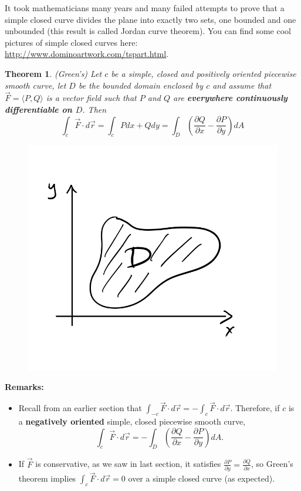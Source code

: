 \documentclass[12pt]{article}
\newcommand{\p}{\partial}
\newcommand{\vr}{\vec{r}{}}
\newcommand{\vF}{\vec{F}}
\renewcommand{\lg}{\langle}
\newcommand{\rg}{\rangle}
\newcommand{\Q}{\frac{\p Q}{\p x}}
\renewcommand{\P}{\frac{\p P}{\p y}}
\newtheorem{theorem}{Theorem}
\begin{document}
It took mathematicians many years and many failed attempts to prove that a simple closed curve divides the plane into exactly two sets, one bounded and one unbounded (this result is called Jordan curve theorem). You can find some cool pictures of simple closed curves here: \url{http://www.dominoartwork.com/tspart.html}.

\begin{theorem}(Green's)
Let $c$ be a simple, closed and positively oriented piecewise smooth curve, let $D$ be the bounded domain enclosed by $c$ and assume that $\vF=\lg P,Q\rg$ is a vector field such that $P$ and $Q$ are \textbf{everywhere continuously differentiable on $D$}. Then
\begin{equation}
\int_c\vF\cdot d\vr=\int_cPdx+Q dy=\int_D\left( \Q-\P\right )dA
\end{equation}
\end{theorem}

\begin{figure}[h]
\includegraphics[scale=.3]{thm.jpg}
\end{figure}


\textbf{Remarks:}
\begin{itemize}
\item Recall from an earlier section that $\int_{-c}\vF\cdot d\vr=-\int_c\vF\cdot d\vr$. Therefore, if $c$ is a \textbf{negatively oriented} simple, closed piecewise smooth curve, $$\int_c\vF\cdot d\vr=-\int_D\left( \Q-\P\right )dA.$$
\item If $\vF$ is conservative, as we saw in last section, it satisfies $\P=\Q$, so Green's theorem implies $\int_c \vF \cdot d\vr=0 $ over a simple closed curve (as expected).
\end{itemize}
\end{document}
